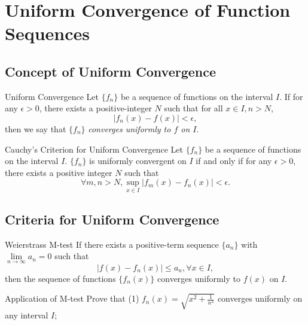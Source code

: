 
\section{Uniform Convergence of Function Sequences}

\subsection{Concept of Uniform Convergence}

\begin{definition}{Uniform Convergence}{}
  Let $\{f_n\}$ be a sequence of functions on the interval $I$.
  If for any $\epsilon > 0$, there exists a positive-integer $N$
  such that for all $x \in I, n > N$,
  \begin{equation}
    |f_n(x) - f(x)| < \epsilon,
  \end{equation}
  then we say that $\{f_n\}$ \emph{converges uniformly to $f$ on $I$}.
\end{definition}

\begin{theorem}{Cauchy's Criterion for Uniform Convergence}{}
  Let $\{f_n\}$ be a sequence of functions on the interval $I$.
  $\{f_n\}$ is uniformly convergent on $I$ if and only if
  for any $\epsilon > 0$, there exists a positive integer $N$ such that
  \begin{equation}
    \forall m,n > N, \sup \limits_{x \in I} |f_m(x) - f_n(x)| < \epsilon.
  \end{equation}
\end{theorem}

\subsection{Criteria for Uniform Convergence}

\begin{theorem}{Weierstrass M-test}{}
  If there exists a positive-term sequence $\{a_n\}$
  with $\lim \limits _{n \rightarrow \infty} a_n = 0$ such that
  \begin{equation}
    |f(x) - f_n(x)| \leq a_n, \forall x \in I,
  \end{equation}
  then the sequence of functions $\{f_n(x)\}$ converges uniformly to $f(x)$ on $I$.
\end{theorem}

\begin{example}{Application of M-test}{}
  Prove that
  (1) $f_n(x) = \sqrt{x^2 + \frac{1}{n^2}}$ converges uniformly on any interval $I$;
\end{example}

